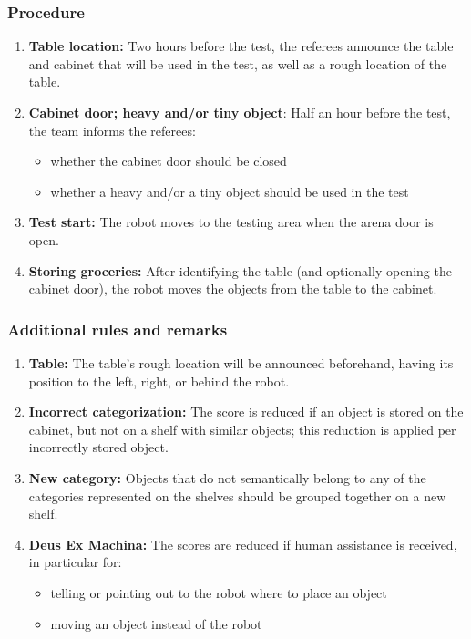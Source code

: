 \subsubsection*{Procedure}
\begin{enumerate}[nosep]
	\item \textbf{Table location:} Two hours before the test, the referees announce the table and cabinet that will be used in the test, as well as a rough location of the table.
	\item \textbf{Cabinet door; heavy and/or tiny object}: Half an hour before the test, the team informs the referees:
		\begin{itemize}
			\item whether the cabinet door should be closed
			\item whether a heavy and/or a tiny object should be used in the test
		\end{itemize}
	\item \textbf{Test start:} The robot moves to the testing area when the arena door is open.
	\item \textbf{Storing groceries:} After identifying the table (and optionally opening the cabinet door), the robot moves the objects from the table to the cabinet.
\end{enumerate}


\subsubsection*{Additional rules and remarks}
\begin{enumerate}
	\item \textbf{Table:} The table's rough location will be announced beforehand, having its position to the left, right, or behind the robot.
	\item \textbf{Incorrect categorization:} The score is reduced if an object is stored on the cabinet, but not on a shelf with similar objects; this reduction is applied per incorrectly stored object.
	\item \textbf{New category:} Objects that do not semantically belong to any of the categories represented on the shelves should be grouped together on a new shelf.
	\item \textbf{Deus Ex Machina:} The scores are reduced if human assistance is received, in particular for:
	\begin{itemize}
		\item telling or pointing out to the robot where to place an object
		\item moving an object instead of the robot
	\end{itemize}
\end{enumerate}

